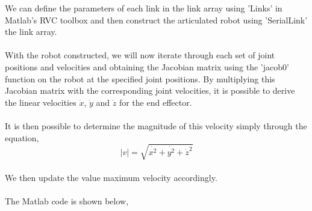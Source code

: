 We can define the parameters of each link in the link array using 'Links' in Matlab's RVC toolbox and then construct the articulated robot using 'SerialLink' the link array.
\\ \\ With the robot constructed, we will now iterate through each set of joint positions and velocities and obtaining the Jacobian matrix using the 'jacob0' function on the robot at the specified joint positions. By multiplying this Jacobian matrix with the corresponding joint velocities, it is possible to derive the linear velocities $\dot{x}$, $\dot{y}$ and $\dot{z}$ for the end effector.
\\ \\ It is then possible to determine the magnitude of this velocity simply through the equation,
\begin{equation*}
    |v| = \sqrt{\dot{x^2} + \dot{y^2} + \dot{z}^2}
\end{equation*}
\\ We then update the value maximum velocity accordingly.
\\ \\ The Matlab code is shown below,

